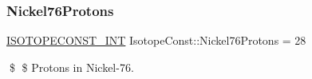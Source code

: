 \subsubsection{\texorpdfstring{Nickel76\+Protons}{Nickel76Protons}}
{\footnotesize\ttfamily \mbox{\hyperlink{group___isotope_const-_macros_ga5f18360b3e99483a35c32d789e62621c}{I\+S\+O\+T\+O\+P\+E\+C\+O\+N\+S\+T\+\_\+\+I\+NT}} Isotope\+Const\+::\+Nickel76\+Protons = 28}

\$ \$ Protons in Nickel-\/76. 